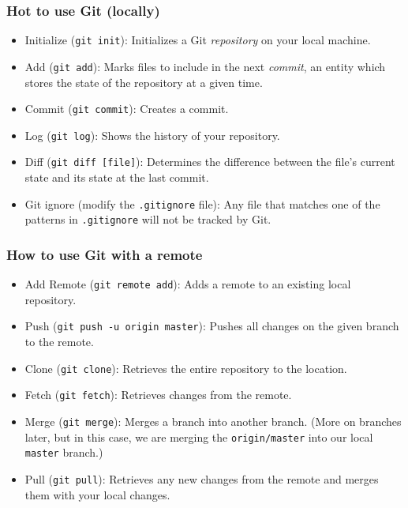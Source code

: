 \documentclass{lug}
\begin{document}
\begin{frame}
    \frametitle{Hot to use Git (locally)}

    \begin{itemize}
        \item Initialize (\texttt{git init}): Initializes a Git \textit{repository} on your local
            machine.
        \item Add (\texttt{git add}): Marks files to include in the next \textit{commit}, an entity
            which stores the state of the repository at a given time.
        \item Commit (\texttt{git commit}): Creates a commit.
        \item Log (\texttt{git log}): Shows the history of your repository.
        \item Diff (\texttt{git diff [file]}): Determines the difference between the file's current
            state and its state at the last commit.
        \item Git ignore (modify the \texttt{.gitignore} file): Any file that matches one of the
            patterns in \texttt{.gitignore} will not be tracked by Git.
    \end{itemize}
\end{frame}

\begin{frame}
    \frametitle{How to use Git with a remote}

    \begin{itemize}
        \item Add Remote (\texttt{git remote add}): Adds a remote to an existing local repository.
        \item Push (\texttt{git push -u origin master}): Pushes all changes on the given branch
            to the remote.
        \item Clone (\texttt{git clone}): Retrieves the entire repository to the location.
        \item Fetch (\texttt{git fetch}): Retrieves changes from the remote.
        \item Merge (\texttt{git merge}): Merges a branch into another branch. (More on branches
            later, but in this case, we are merging the \texttt{origin/master} into our local
            \texttt{master} branch.)
        \item Pull (\texttt{git pull}): Retrieves any new changes from the remote and merges them
            with your local changes.
    \end{itemize}
\end{frame}
\end{document}
